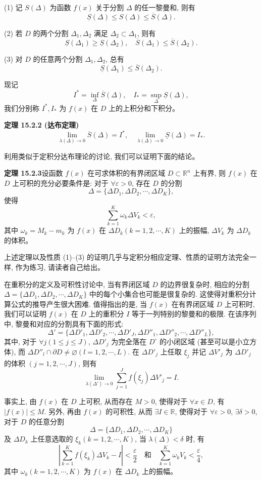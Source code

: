 \documentclass[UTF8, 12pt, fontset=fandol, oneside]{ctexart}
\begin{document}
(1) 记 $S(\Delta)$ 为函数 $f(x)$ 关于分割 $\Delta$ 的任一黎曼和, 则有
\[
  \underline S(\Delta)\leqslant S(\Delta)\leqslant\overline S(\Delta).
\]

(2) 若 $D$ 的两个分割 $\Delta_1,\Delta_2$ 满足 $\Delta_2\subset\Delta_1$, 则有
\[
  \underline S(\Delta_1)\geqslant\underline S(\Delta_2),\quad
  \overline S(\Delta_1)\leqslant\overline S(\Delta_2).
\]

(3) 对 $D$ 的任意两个分割 $\Delta_1,\Delta_2$, 总有
\[
  \underline S(\Delta_1)\leqslant\overline S(\Delta_2).
\]

现记
\[
  I^*=\inf_\Delta\overline S(\Delta),\quad
  I_*=\sup_\Delta\underline S(\Delta),
\]
我们分别称 $I^*,I_*$ 为 $f(x)$ 在 $D$ 上的上积分和下积分。

\noindent\textbf{定理 15.2.2 (达布定理)}\quad
\[
  \lim_{\lambda(\Delta)\to0}\overline S(\Delta)=I^*,\quad
  \lim_{\lambda(\Delta)\to0}\underline S(\Delta)=I_*.
\]

利用类似于定积分达布理论的讨论, 我们可以证明下面的结论。

\noindent\textbf{定理 15.2.3}\quad 设函数 $f(x)$ 在可求体积的有界闭区域 $D\subset\mathbb R^n$ 上有界, 则 $f(x)$ 在 $D$ 上可积的充分必要条件是: 对于 $\forall\varepsilon>0$, 存在 $D$ 的分割
\[
  \Delta=\{\Delta D_1,\Delta D_2,\cdots,\Delta D_K\},
\]
使得
\[
  \sum_{k=1}^K\omega_k\Delta V_k<\varepsilon,
\]
其中 $\omega_k=M_k-m_k$ 为 $f(x)$ 在 $\Delta D_k(k=1,2,\cdots,K)$ 上的振幅, $\Delta V_k$ 为 $\Delta D_k$ 的体积。

上述定理以及性质 (1)--(3) 的证明几乎与定积分相应定理、性质的证明方法完全一样, 作为练习, 请读者自己给出。

在重积分的定义及可积性讨论中, 当有界闭区域 $D$ 的边界很复杂时, 相应的分割 $\Delta=\{\Delta D_1,\Delta D_2,\cdots,\Delta D_K\}$ 中的每个小集合也可能是很复杂的. 这使得对重积分计算公式的推导产生很大困难. 值得指出的是, 当 $f(x)$ 在有界闭区域 $D$ 上可积时, 我们可以证明 $f(x)$ 在 $D$ 上的重积分 $I$ 等于一列特别的黎曼和的极限. 在该序列中, 黎曼和对应的分割具有下面的形式:
\[
  \Delta'=\{\Delta D'_1,\Delta D'_2,\cdots,\Delta D'_J,\Delta D''_1,\Delta D''_2,\cdots,\Delta D''_L\},
\]
其中, 对于 $\forall j(1\leqslant j\leqslant J)$, $\Delta D'_j$ 为完全落在 $D^\circ$ 的小闭区域 (甚至可以是小立方体), 而 $\Delta D''_l\cap\partial D\ne\varnothing(l=1,2,\cdots,L)$. 在 $\Delta D'_j$ 上任取 $\xi_j$ 并记 $\Delta V'_j$ 为 $\Delta D'_j$ 的体积 $(j=1,2,\cdots,J)$, 则有
\[
  \lim_{\lambda(\Delta')\to0}\sum_{j=1}^J f(\xi_j)\Delta V'_j=I.
\]

事实上, 由 $f(x)$ 在 $D$ 上可积, 从而存在 $M>0$, 使得对于 $\forall x\in D$, 有 $|f(x)|\leqslant M$. 另外, 再由 $f(x)$ 的可积性, 从而 $\exists I\in\mathbb R$, 使得对于 $\forall\varepsilon>0$, $\exists\delta>0$, 对于 $D$ 的任意分割
\[
  \Delta=\{\Delta D_1,\Delta D_2,\cdots,\Delta D_K\}
\]
及 $\Delta D_k$ 上任意选取的 $\xi_k(k=1,2,\cdots,K)$, 当 $\lambda(\Delta)<\delta$ 时, 有
\[
  \left|\sum_{k=1}^K f(\xi_k)\Delta V_k-I\right|<\frac{\varepsilon}{2}
  \quad\text{和}\quad
  \sum_{k=1}^K\omega_kV_k<\frac{\varepsilon}{4},
\]
其中 $\omega_k(k=1,2,\cdots,K)$ 为 $f(x)$ 在 $\Delta D_k$ 上的振幅。
\end{document}
